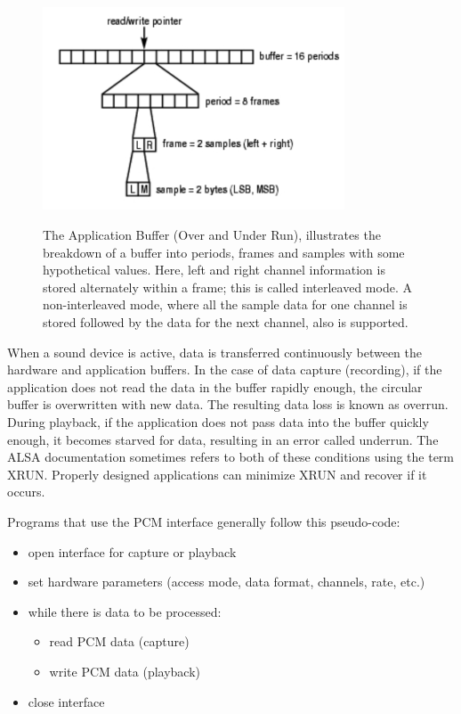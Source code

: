 \documentclass{article}
\begin{document}
\begin{figure}[!hb]
    \begin{minipage}[b]{0.49\textwidth}
    	\centering
		\includegraphics[width=0.8\textwidth]{IMG/ALSA.PNG}   	
	\end{minipage}
    \hfill
    \begin{minipage}[b]{0.49\textwidth}
		The Application Buffer (Over and Under Run), illustrates the breakdown of a buffer into periods, frames and samples with some hypothetical values. Here, left and right channel information is stored alternately within a frame; this is called interleaved mode. A non-interleaved mode, where all the sample data for one channel is stored followed by the data for the next channel, also is supported. 	
	\end{minipage}
\end{figure}





When a sound device is active, data is transferred continuously between the hardware and application buffers. In the case of data capture (recording), if the application does not read the data in the buffer rapidly enough, the circular buffer is overwritten with new data. The resulting data loss is known as overrun. During playback, if the application does not pass data into the buffer quickly enough, it becomes starved for data, resulting in an error called underrun. The ALSA documentation sometimes refers to both of these conditions using the term XRUN. Properly designed applications can minimize XRUN and recover if it occurs.

\noindent Programs that use the PCM interface generally follow this pseudo-code:
\begin{itemize}
	\item open interface for capture or playback
	\item set hardware parameters (access mode, data format, channels, rate, etc.)
	\item while there is data to be processed:
	\begin{itemize}
		\item read PCM data (capture)
		\item write PCM data (playback)
	\end{itemize}
	\item close interface
\end{itemize}
	
\end{document}
